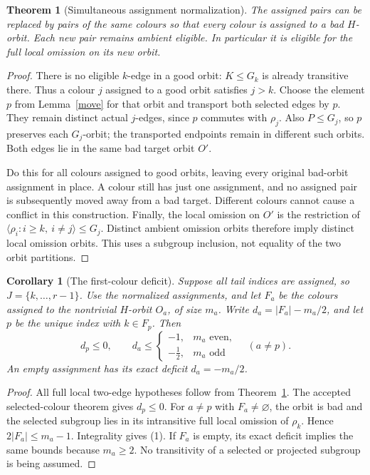 \documentclass[11pt,a4paper]{article}
\newtheorem{theorem}[lemma]{Theorem}
\newtheorem{corollary}[lemma]{Corollary}
\newcommand{\gen}[1]{\langle#1\rangle}
\begin{document}
\begin{theorem}[Simultaneous assignment normalization]\label{normal}
The assigned pairs can be replaced by pairs of the same colours
so that every colour is assigned to a bad $H$-orbit. Each new pair
remains ambient eligible. In particular it is eligible for the
full local omission on its new orbit.
\end{theorem}
\begin{proof}
There is no eligible $k$-edge in a good orbit: $K\le G_k$ is
already transitive there. Thus a colour $j$ assigned to a good
orbit satisfies $j>k$. Choose the element $p$ from Lemma~\ref{move}
for that orbit and transport both selected edges by $p$.
They remain distinct actual $j$-edges, since $p$ commutes with
$\rho_j$. Also $P\le G_j$, so $p$ preserves each $G_j$-orbit;
the transported endpoints remain in different such orbits.
Both edges lie in the same bad target orbit $O'$.

Do this for all colours assigned to good orbits, leaving every
original bad-orbit assignment in place. A colour still has just
one assignment, and no assigned pair is subsequently moved away
from a bad target. Different colours cannot cause a conflict in
this construction. Finally, the local omission on $O'$ is the
restriction of $\gen{\rho_i:i\ge k,\ i\ne j}\le G_j$.
Distinct ambient omission orbits therefore imply distinct local
omission orbits. This uses a subgroup inclusion, not equality of
the two orbit partitions.
\end{proof}

\begin{corollary}[The first-colour deficit]\label{deficit}
Suppose all tail indices are assigned, so $J=\{k,\ldots,r-1\}$.
Use the normalized assignments, and let $F_a$ be the colours
assigned to the nontrivial $H$-orbit $O_a$, of size $m_a$.
Write $d_a=|F_a|-m_a/2$, and let $p$ be the unique index with
$k\in F_p$. Then
\[
 d_p\le0,\qquad
 d_a\le
 \begin{cases}-1,&m_a\text{ even},\\-\tfrac12,&m_a\text{ odd}
 \end{cases}\quad(a\ne p).                         \tag{1}
\]
An empty assignment has its exact deficit $d_a=-m_a/2$.
\end{corollary}
\begin{proof}
All full local two-edge hypotheses follow from Theorem~\ref{normal}.
The accepted selected-colour theorem gives $d_p\le0$.
For $a\ne p$ with $F_a\ne\varnothing$, the orbit is bad and
the selected subgroup lies in its intransitive full local omission
of $\rho_k$. Hence $2|F_a|\le m_a-1$. Integrality gives (1).
If $F_a$ is empty, its exact deficit implies the same bounds because
$m_a\ge2$. No transitivity of a selected or projected subgroup is
being assumed.
\end{proof}
\end{document}
